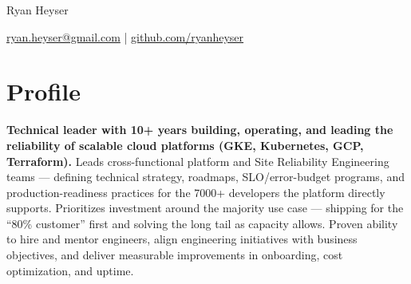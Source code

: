 \documentclass[11pt]{article}
\begin{document}
\centerline{\Huge Ryan Heyser}
\vspace{5pt}
\centerline{\href{mailto:ryan.heyser@gmail.com}{ryan.heyser@gmail.com} | \href{https://github.com/ryanheyser}{github.com/ryanheyser}}
\vspace{-18.5pt}

\section*{Profile}
\begin{description}
\item\textbf{Technical leader with 10+ years building, operating, and leading the reliability of scalable cloud platforms (GKE, Kubernetes, GCP, Terraform).} Leads cross-functional platform and Site Reliability Engineering teams — defining technical strategy, roadmaps, SLO/error-budget programs, and production-readiness practices for the 7000+ developers the platform directly supports. Prioritizes investment around the majority use case — shipping for the ``80\% customer'' first and solving the long tail as capacity allows. Proven ability to hire and mentor engineers, align engineering initiatives with business objectives, and deliver measurable improvements in onboarding, cost optimization, and uptime.\\
\end{description}

\vspace{-18.5pt}
\end{document}
